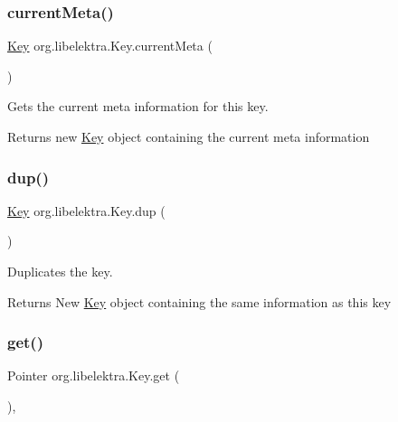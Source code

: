 \subsubsection{\texorpdfstring{current\+Meta()}{currentMeta()}}
{\footnotesize\ttfamily \hyperlink{classorg_1_1libelektra_1_1Key}{Key} org.\+libelektra.\+Key.\+current\+Meta (\begin{DoxyParamCaption}{ }\end{DoxyParamCaption})\hspace{0.3cm}{\ttfamily [inline]}}



Gets the current meta information for this key. 

\begin{DoxyReturn}{Returns}
new \hyperlink{classorg_1_1libelektra_1_1Key}{Key} object containing the current meta information 
\end{DoxyReturn}
\mbox{\label{classorg_1_1libelektra_1_1Key_a67a839951aa9bc48f8ffbb1ebcdfb819}} 
\subsubsection{\texorpdfstring{dup()}{dup()}}
{\footnotesize\ttfamily \hyperlink{classorg_1_1libelektra_1_1Key}{Key} org.\+libelektra.\+Key.\+dup (\begin{DoxyParamCaption}{ }\end{DoxyParamCaption})\hspace{0.3cm}{\ttfamily [inline]}}



Duplicates the key. 

\begin{DoxyReturn}{Returns}
New \hyperlink{classorg_1_1libelektra_1_1Key}{Key} object containing the same information as this key 
\end{DoxyReturn}
\mbox{\label{classorg_1_1libelektra_1_1Key_a3c65267ac3d24c3eae35db576414fe4f}} 
\subsubsection{\texorpdfstring{get()}{get()}}
{\footnotesize\ttfamily Pointer org.\+libelektra.\+Key.\+get (\begin{DoxyParamCaption}{ }\end{DoxyParamCaption})\hspace{0.3cm}{\ttfamily [inline]}, {\ttfamily [protected]}}



